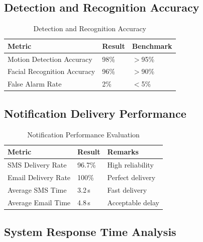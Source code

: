 \documentclass[12pt,a4paper,oneside]{report}
\begin{document}
\subsection{Detection and Recognition Accuracy}

\begin{table}[htbp]
  \centering
  \caption{Detection and Recognition Accuracy}
  {\small
  \begin{tabular}{|p{5.00cm}|p{4.00cm}|p{5.00cm}|}
    \hline
    \textbf{Metric} & \textbf{Result} & \textbf{Benchmark} \\
    \hline
    Motion Detection Accuracy    & 98\%  & $>$95\% \\
    Facial Recognition Accuracy  & 96\%  & $>$90\% \\
    False Alarm Rate             & 2\%   & $<$5\% \\
    \hline
  \end{tabular}
  }
\end{table}

\subsection{Notification Delivery Performance}

\begin{table}[htbp]
  \centering
  \caption{Notification Performance Evaluation}
  {\small
  \begin{tabular}{|p{5.00cm}|p{3.50cm}|p{5.50cm}|}
    \hline
    \textbf{Metric} & \textbf{Result} & \textbf{Remarks} \\
    \hline
    SMS Delivery Rate    & 96.7\%  & High reliability \\
    Email Delivery Rate  & 100\%   & Perfect delivery \\
    Average SMS Time     & 3.2\,s  & Fast delivery \\
    Average Email Time   & 4.8\,s  & Acceptable delay \\
    \hline
  \end{tabular}
  }
\end{table}

\subsection{System Response Time Analysis}
\end{document}
